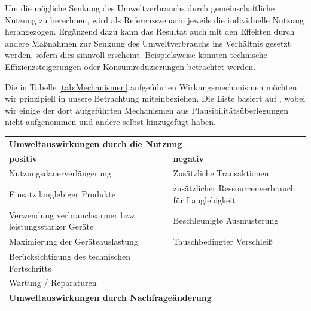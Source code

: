 \documentclass[11pt, titlepage=true]{scrartcl} %
\begin{document}
Um die mögliche Senkung des Umweltverbrauchs durch gemeinschaftliche Nutzung zu berechnen, wird als Referenzszenario jeweils die individuelle Nutzung herangezogen. Ergänzend dazu kann das Resultat auch mit den Effekten durch andere Maßnahmen zur Senkung des Umweltverbrauchs ins Verhältnis gesetzt werden, sofern dies sinnvoll erscheint. Beispielsweise könnten technische Effizienzsteigerungen oder Konsumreduzierungen betrachtet werden.

Die in Tabelle \ref{tab:Mechanismen} aufgeführten Wirkungsmechanismen möchten wir prinzipiell in unsere Betrachtung miteinbeziehen. Die Liste basiert auf \cite{scholl_marketing_2009}, wobei wir einige der dort aufgeführten Mechanismen aus Plausibilitätsüberlegungen nicht aufgenommen und andere selbst hinzugefügt haben.

{\tiny \begin{table}[h]
	\begin{tabular}{p{7cm}p{7cm}}
		 \toprule
		 \multicolumn{2}{l}{\textbf{Umweltauswirkungen durch die Nutzung}} \vspace{0.2 cm} \\
		 \textbf{positiv} & \textbf{negativ} \\
		 \midrule
		 Nutzungsdauer\-verlängerung \vspace{0.2cm} &  Zusätzliche Transaktionen \vspace{0.2cm} \\
		 Einsatz langlebiger Produkte \vspace{0.2cm} &  zusätzlicher Ressourcenverbrauch für Langlebigkeit \vspace{0.2cm} \\
		 Verwendung verbrauchsarmer bzw. leistungsstarker Geräte \vspace{0.2cm} &  Beschleunigte Ausmusterung \vspace{0.2cm} \\
		 Maximierung der Geräteauslastung \vspace{0.2cm} & Tauschbedingter Verschleiß \vspace{0.2cm} \\
		 Berücksichtigung des technischen Fortschritts \vspace{0.2cm} & \vspace{0.2cm} \\
		 Wartung / Reparaturen \vspace{0.5cm}& \\
		 \midrule
		 \multicolumn{2}{l}{\textbf{Umweltauswirkungen durch Nachfrageänderung}} \vspace{0.2 cm} \\

\end{tabular}
\end{table}}
\end{document}
